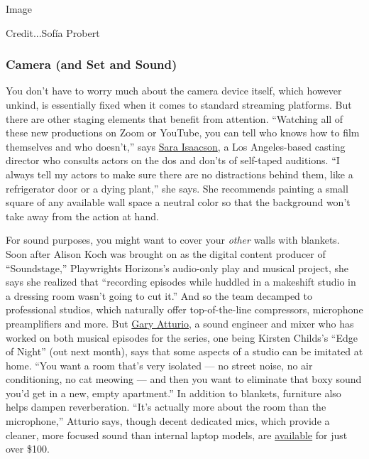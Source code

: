 Image

Credit...Sofía Probert

\hypertarget{camera-and-set-and-sound}{%
\subsubsection{\texorpdfstring{\textbf{Camera (and Set and
Sound)}}{Camera (and Set and Sound)}}\label{camera-and-set-and-sound}}

You don't have to worry much about the camera device itself, which
however unkind, is essentially fixed when it comes to standard streaming
platforms. But there are other staging elements that benefit from
attention. ``Watching all of these new productions on Zoom or YouTube,
you can tell who knows how to film themselves and who doesn't,'' says
\href{https://www.saraisaacsoncasting.com/}{Sara Isaacson}, a Los
Angeles-based casting director who consults actors on the dos and don'ts
of self-taped auditions. ``I always tell my actors to make sure there
are no distractions behind them, like a refrigerator door or a dying
plant,'' she says. She recommends painting a small square of any
available wall space a neutral color so that the background won't take
away from the action at hand.

For sound purposes, you might want to cover your \emph{other} walls with
blankets. Soon after Alison Koch was brought on as the digital content
producer of ``Soundstage,'' Playwrights Horizons's audio-only play and
musical project, she says she realized that ``recording episodes while
huddled in a makeshift studio in a dressing room wasn't going to cut
it.'' And so the team decamped to professional studios, which naturally
offer top-of-the-line compressors, microphone preamplifiers and more.
But \href{https://www.instagram.com/gare_saw_bear/?hl=en}{Gary Atturio},
a sound engineer and mixer who has worked on both musical episodes for
the series, one being Kirsten Childs's ``Edge of Night'' (out next
month), says that some aspects of a studio can be imitated at home.
``You want a room that's very isolated --- no street noise, no air
conditioning, no cat meowing --- and then you want to eliminate that
boxy sound you'd get in a new, empty apartment.'' In addition to
blankets, furniture also helps dampen reverberation. ``It's actually
more about the room than the microphone,'' Atturio says, though decent
dedicated mics, which provide a cleaner, more focused sound than
internal laptop models, are
\href{https://www.bluedesigns.com/products/yeti/}{available} for just
over \$100.

